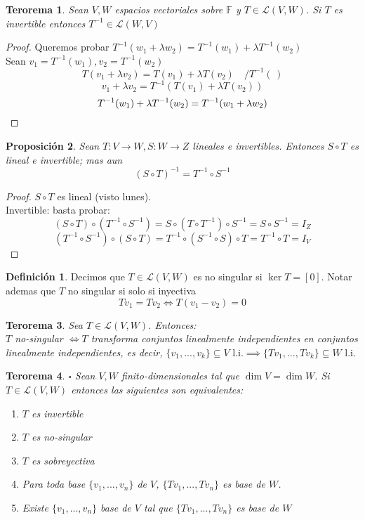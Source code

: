 \documentclass[11pt]{book}
\newtheorem{thm}{Terorema}[section]
\newtheorem{prop}[thm]{Proposición}
\theoremstyle{definition}
\newtheorem{defn}{Definición}[section]
\begin{document}
\begin{thm}
Sean $V,W$ espacios vectoriales sobre $\mathbb{F}$ y $T\in\mathcal{L}(V,W)$. Si $T$ es invertible entonces $T^{-1}\in\mathcal{L}(W,V)$
\end{thm}
\begin{proof}
Queremos probar $T^{-1}(w_1+\lambda w_2)=T^{-1}(w_1)+\lambda T^{-1}(w_2)$\\
Sean $v_1=T^{-1}(w_1),v_2=T^{-1}(w_2)$
\[
T(v_1+\lambda v_2)=T(v_1)+\lambda T(v_2)\quad /T^{-1}(\,)
\]
\[
v_1+\lambda v_2=T^{-1}(T(v_1)+\lambda T(v_2))
\]
\begin{equation}
T^{-1}(w_1)+\lambda T^{-1}(w_2)=T^{-1}(w_1+\lambda w_2)\qedhere
\end{equation}
\end{proof}
\begin{prop}
Sean $T:V\rightarrow W,S:W\rightarrow Z$ lineales e invertibles. Entonces $S\circ T$ es lineal e invertible; mas aun
\begin{equation}
(S\circ T)^{-1}=T^{-1}\circ S^{-1}
\end{equation}
\end{prop}
\begin{proof}
$S\circ T$ es lineal (visto lunes).\\
Invertible: basta probar:
\[
(S\circ T)\circ(T^{-1}\circ S^{-1})=S\circ (T\circ T^{-1})\circ S^{-1}=S\circ S^{-1}=I_Z
\]
\[
(T^{-1}\circ S^{-1})\circ (S\circ T)=T^{-1}\circ (S^{-1}\circ S)\circ T=T^{-1}\circ T=I_V
\]
\end{proof}
\begin{defn}
Decimos que $T\in\mathcal{L}(V,W)$ es no singular si $\ker T=[0]$. Notar ademas que $T$ no singular si solo si inyectiva
\begin{equation}
Tv_1=Tv_2\iff T(v_1-v_2)=0
\end{equation}
\end{defn}
\begin{thm}
Sea $T\in\mathcal{L}(V,W)$. Entonces:\\
$T$ no-singular $\iff T$ transforma conjuntos linealmente independientes en conjuntos linealmente independientes, es decir, $\{v_1,...,v_k\}\subseteq V\textrm{ l.i.}\implies\{Tv_1,...,Tv_k\}\subseteq W\textrm{ l.i.}$
\end{thm}
\begin{thm}{$\square$ }
Sean $V,W$ finito-dimensionales tal que $\dim V=\dim W$. Si $T\in\mathcal{L}(V,W)$ entonces las siguientes son equivalentes:
\begin{enumerate}[label=\roman*)]
	\item $T$ es invertible
	
	\item $T$ es no-singular
	
	\item $T$ es sobreyectiva
	
	\item Para toda base $\{v_1,...,v_n\}$ de $V$, $\{Tv_1,...,Tv_n\}$ es base de $W$.
	
	\item Existe $\{v_1,...,v_n\}$ base de $V$ tal que $\{Tv_1,...,Tv_n\}$ es base de $W$
\end{enumerate}
\end{thm}
\end{document}
